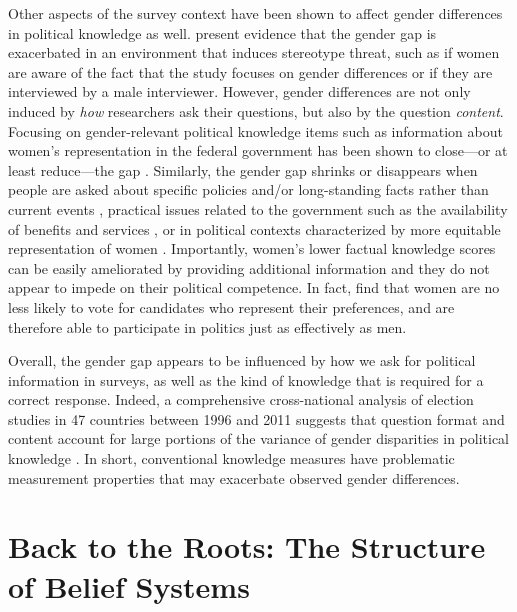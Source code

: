 Other aspects of the survey context have been shown to affect gender differences in political knowledge as well. \citet{mcglone2006stereotype} present evidence that the gender gap is exacerbated in an environment that induces stereotype threat, such as if women are aware of the fact that the study focuses on gender differences or if they are interviewed by a male interviewer. However, gender differences are not only induced by \textit{how} researchers ask their questions, but also by the question \textit{content}. Focusing on gender-relevant political knowledge items such as information about women's representation in the federal government has been shown to close---or at least reduce---the gap \citep{graber2001processing,dolan2011women,fraile2014does,barabas2014question}. Similarly, the gender gap shrinks or disappears when people are asked about specific policies and/or long-standing facts rather than current events \citep{ferrin2018simply}, practical issues related to the government such as the availability of benefits and services \citep{stolle2010women}, or in political contexts characterized by more equitable representation of women \citep{pereira2019gendered,mcallister2019gender,wolak2019descriptive}. Importantly, women's lower factual knowledge scores can be easily ameliorated by providing additional information \citep{jerit2017revisiting} and they do not appear to impede on their political competence. In fact, \citet{dassonneville2020women} find that women are no less likely to vote for candidates who represent their preferences, and are therefore able to participate in politics just as effectively as men.

Overall, the gender gap appears to be influenced by how we ask for political information in surveys, as well as the kind of knowledge that is required for a correct response. Indeed, a comprehensive cross-national analysis of election studies in 47 countries between 1996 and 2011 suggests that question format and content account for large portions of the variance of gender disparities in political knowledge \citep{fortin2016cross,fortin2020political}. In short, conventional knowledge measures have problematic measurement properties that may exacerbate observed gender differences. 



\section*{Back to the Roots: The Structure of Belief Systems}

